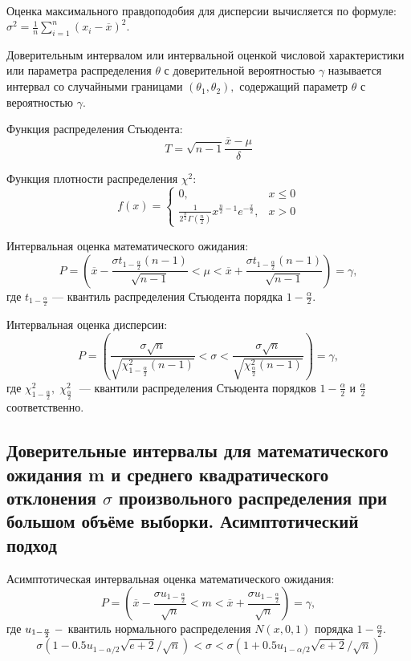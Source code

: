 \documentclass[12pt,a4paper]{article}
\begin{document}
		Оценка максимального правдоподобия для дисперсии вычисляется по формуле: $\sigma^2 = \frac{1}{n}\sum\limits_{i=1}^n(x_i-\overline{x})^2.$
		
		Доверительным интервалом или интервальной оценкой числовой характеристики или параметра распределения $\theta$ с доверительной вероятностью $\gamma$ называется интервал со случайными границами $(\theta_1,\theta_2),$ содержащий параметр $\theta$ с вероятностью $\gamma$.
		
		Функция распределения Стьюдента:
		\begin{equation}
		T = \sqrt{n-1}\frac{\overline{x}-\mu}{\delta}
		\end{equation}
		
		Функция плотности распределения $\chi^2$:
		\begin{equation}
		f(x) =
		\begin{cases}
		0,&x\leq 0\\
		\frac{1}{2^\frac{n}{2}\Gamma\left(\frac{n}{2}\right)}x^{\frac{n}{2}-1}e^{-\frac{x}{2}},& x>0
		\end{cases}
		\end{equation}
		
		Интервальная оценка математического ожидания:
		\begin{equation}
		P=\left(\overline{x}-\frac{\sigma t_{1-\frac{\alpha}{2}}(n-1)}{\sqrt{n-1}}<\mu<\overline{x}+\frac{\sigma t_{1-\frac{\alpha}{2}}(n-1)}{\sqrt{n-1}}\right) = \gamma,
		\end{equation}
		где $t_{1-\frac{\alpha}{2}}$ --- квантиль распределения Стьюдента порядка $1-\frac{\alpha}{2}$.
		
		Интервальная оценка дисперсии:
		\begin{equation}
		P=\left(\frac{\sigma\sqrt{n}}{\sqrt{\chi^2_{1-\frac{\alpha}{2}}(n-1)}}<\sigma<\frac{\sigma\sqrt{n}}{\sqrt{\chi^2_\frac{\alpha}{2}(n-1)}}\right) = \gamma,
		\end{equation}
		где $\chi_{1-\frac{\alpha}{2}}^2,\;\chi_\frac{\alpha}{2}^2\;$ --- квантили распределения Стьюдента порядков $1-\frac{\alpha}{2}$ и $\frac{\alpha}{2}$ соответственно.
		
	\subsection{Доверительные интервалы для математического ожидания m и среднего квадратического отклонения $\sigma$ произвольного распределения при большом объёме выборки. Асимптотический подход}
		
		Асимптотическая интервальная оценка математического ожидания:
		\begin{equation}
		P = \left(\overline{x}-\frac{\sigma u_{1-\frac{\alpha}{2}}}{\sqrt{n}}<m<\overline{x}+\frac{\sigma u_{1-\frac{\alpha}{2}}}{\sqrt{n}}\right)=\gamma,
		\end{equation}
		где $u_{1-\frac{\alpha}{2}}\;\--$ квантиль нормального распределения $N(x,0,1)$ порядка $1-\frac{\alpha}{2}$.
		\begin{equation}
		\sigma(1 - 0.5u_{1 - \alpha/2} \sqrt{e + 2}/ \sqrt{n}) < \sigma < \sigma(1 + 0.5u_{1 - \alpha/2} \sqrt{e + 2}/ \sqrt{n})
		\end{equation}
	
\end{document}
